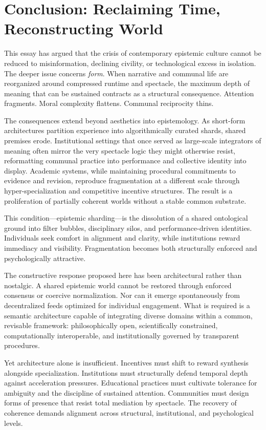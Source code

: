 \documentclass[12pt]{article}
\begin{document}
\section{Conclusion: Reclaiming Time, Reconstructing World}
\label{sec:conclusion}

This essay has argued that the crisis of contemporary epistemic culture cannot be reduced to misinformation, declining civility, or technological excess in isolation. The deeper issue concerns \emph{form}. When narrative and communal life are reorganized around compressed runtime and spectacle, the maximum depth of meaning that can be sustained contracts as a structural consequence. Attention fragments. Moral complexity flattens. Communal reciprocity thins.

The consequences extend beyond aesthetics into epistemology. As short-form architectures partition experience into algorithmically curated shards, shared premises erode. Institutional settings that once served as large-scale integrators of meaning often mirror the very spectacle logic they might otherwise resist, reformatting communal practice into performance and collective identity into display. Academic systems, while maintaining procedural commitments to evidence and revision, reproduce fragmentation at a different scale through hyper-specialization and competitive incentive structures. The result is a proliferation of partially coherent worlds without a stable common substrate.

This condition---epistemic sharding---is the dissolution of a shared ontological ground into filter bubbles, disciplinary silos, and performance-driven identities. Individuals seek comfort in alignment and clarity, while institutions reward immediacy and visibility. Fragmentation becomes both structurally enforced and psychologically attractive.

The constructive response proposed here has been architectural rather than nostalgic. A shared epistemic world cannot be restored through enforced consensus or coercive normalization. Nor can it emerge spontaneously from decentralized feeds optimized for individual engagement. What is required is a semantic architecture capable of integrating diverse domains within a common, revisable framework: philosophically open, scientifically constrained, computationally interoperable, and institutionally governed by transparent procedures.

Yet architecture alone is insufficient. Incentives must shift to reward synthesis alongside specialization. Institutions must structurally defend temporal depth against acceleration pressures. Educational practices must cultivate tolerance for ambiguity and the discipline of sustained attention. Communities must design forms of presence that resist total mediation by spectacle. The recovery of coherence demands alignment across structural, institutional, and psychological levels.
\end{document}

